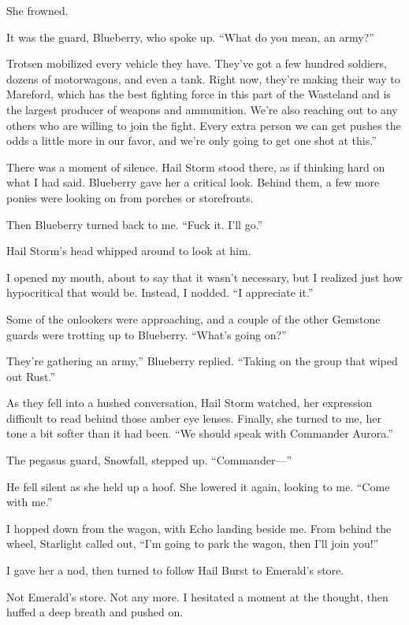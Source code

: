 She frowned.

It was the guard, Blueberry, who spoke up. “What do you mean, an army?”

\leavevmode{}Trotsen mobilized every vehicle they have. They’ve got a few hundred soldiers, dozens of motorwagons, and even a tank. Right now, they’re making their way to Mareford, which has the best fighting force in this part of the Wasteland and is the largest producer of weapons and ammunition. We’re also reaching out to any others who are willing to join the fight. Every extra person we can get pushes the odds a little more in our favor, and we’re only going to get one shot at this.”

There was a moment of silence. Hail Storm stood there, as if thinking hard on what I had said. Blueberry gave her a critical look. Behind them, a few more ponies were looking on from porches or storefronts.

Then Blueberry turned back to me. “Fuck it. I’ll go.”

Hail Storm’s head whipped around to look at him.

I opened my mouth, about to say that it wasn’t necessary, but I realized just how hypocritical that would be. Instead, I nodded. “I appreciate it.”

Some of the onlookers were approaching, and a couple of the other Gemstone guards were trotting up to Blueberry. “What’s going on?”

\leavevmode{}They’re gathering an army,” Blueberry replied. “Taking on the group that wiped out Rust.”

As they fell into a hushed conversation, Hail Storm watched, her expression difficult to read behind those amber eye lenses. Finally, she turned to me, her tone a bit softer than it had been. “We should speak with Commander Aurora.”

The pegasus guard, Snowfall, stepped up. “Commander—”

He fell silent as she held up a hoof. She lowered it again, looking to me. “Come with me.”

I hopped down from the wagon, with Echo landing beside me. From behind the wheel, Starlight called out, “I’m going to park the wagon, then I’ll join you!”

I gave her a nod, then turned to follow Hail Burst to Emerald’s store.

Not Emerald’s store. Not any more. I hesitated a moment at the thought, then huffed a deep breath and pushed on.

